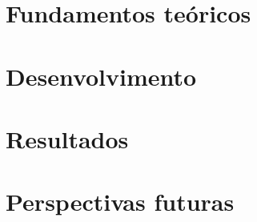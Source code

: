 \documentclass[ twoside,openright,titlepage,numbers=noenddot,headinclude,%
                footinclude=true,cleardoublepage=empty,abstractoff, %
                BCOR=5mm,paper=a4,fontsize=11pt,%
                american,%
                ]{scrreprt}
\begin{document}
 \frenchspacing \raggedbottom {} %
 \pagestyle{plain}
 
 
\cleardoublepage 
\pagestyle{scrheadings} \cleardoublepage
\cleardoublepage{} %
\cleardoublepage
\part{Fundamentos teóricos} 

 
 
\cleardoublepage 

\part{Desenvolvimento}
 


\cleardoublepage
\part{Resultados}

 



\part{Perspectivas futuras}

\appendix
\cleardoublepage
\end{document}
